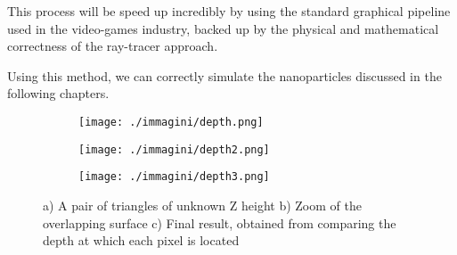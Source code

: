 This process will be speed up incredibly by using the standard graphical pipeline used in the video-games industry, backed up by the physical and mathematical correctness of the ray-tracer approach.

Using this method, we can correctly simulate the nanoparticles discussed in the following chapters.

\begin{figure}[ht]
    \centering
    \begin{subfigure}[b]{0.32\textwidth}
        \texttt{[image: ./immagini/depth.png]}
        \caption{}
        \label{fig:depth_a}
    \end{subfigure}
    \hfill
    \begin{subfigure}[b]{0.32\textwidth}
        \texttt{[image: ./immagini/depth2.png]}
        \caption{}
        \label{fig:depth_b}
    \end{subfigure}
    \hfill
    \begin{subfigure}[b]{0.32\textwidth}
        \texttt{[image: ./immagini/depth3.png]}
        \caption{}
        \label{fig:depth_c}
    \end{subfigure}
    \caption{a) A pair of triangles of unknown Z height b) Zoom of the overlapping surface c) Final result, obtained from comparing the depth at which each pixel is located}
    \label{fig:depth}
\end{figure}